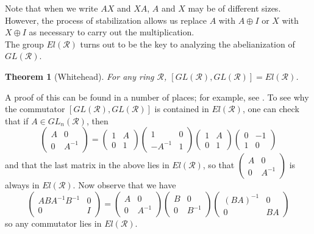 \documentclass{amsart}
\newtheorem{thm}[equation]{Theorem}
\theoremstyle{definition}
\theoremstyle{definition}
\newcommand{\calR}{\mathcal{R}}
\numberwithin{equation}{subsection}
\begin{document}
Note that when we write $AX$ and $XA$, $A$ and $X$ may be of different sizes. However, the process of stabilization allows us replace $A$ with $A \oplus I$ or $X$ with $X \oplus I$ as necessary to carry out the multiplication.\\

The group $El(\calR)$ turns out to be the key to analyzing the abelianization of $GL(\calR)$.

\begin{thm}[Whitehead]\label{thm:whitehead}
For any ring $\calR$, $[GL(\calR),GL(\calR)] = El(\calR)$.
\end{thm}
A proof of this can be found in a number of places; for example, see \cite[Chapter III]{WeibelBook}. To see why the commutator $[GL(\calR),GL(\calR)]$ is contained in $El(\calR)$, one can check that if $A \in GL_{n}(\calR)$, then
$$\begin{pmatrix} A & 0 \\ 0 & A^{-1} \end{pmatrix} = \begin{pmatrix} 1 & A \\ 0 & 1 \end{pmatrix} \begin{pmatrix} 1 & 0 \\ -A^{-1} & 1 \end{pmatrix} \begin{pmatrix} 1 & A \\ 0 & 1 \end{pmatrix} \begin{pmatrix} 0 & -1 \\ 1 & 0 \end{pmatrix}$$
and that the last matrix in the above lies in $El(\calR)$, so that $\begin{pmatrix} A & 0 \\ 0 & A^{-1} \end{pmatrix}$ is always in $El(\calR)$. Now observe that we have
$$\begin{pmatrix} ABA^{-1}B^{-1} & 0 \\ 0 & I \end{pmatrix} = \begin{pmatrix} A & 0 \\ 0 & A^{-1} \end{pmatrix} \begin{pmatrix} B & 0 \\ 0 & B^{-1} \end{pmatrix} \begin{pmatrix} (BA)^{-1} & 0 \\ 0 & BA \end{pmatrix}$$
so any commutator lies in $El(\calR)$.
\end{document}
